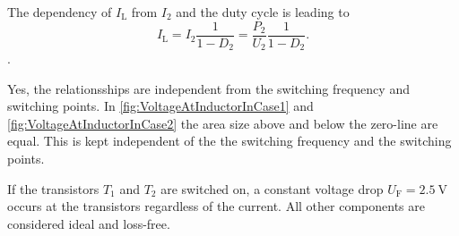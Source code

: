 \begin{solutionblock}
    The dependency of $I_\mathrm{L}$ from $I_\mathrm{2}$ and the duty cycle is leading to
    \begin{equation}
        I_\mathrm{L}=I_\mathrm{2} \frac{1}{1-D_2}= \frac{P_\mathrm{2}}{U_\mathrm{2}} \frac{1}{1-D_2}.
    \end{equation}.
\end{solutionblock}


\begin{solutionblock}
    Yes, the relationsships are independent from the switching frequency and switching points.
    In \autoref{fig:VoltageAtInductorInCase1} and \autoref{fig:VoltageAtInductorInCase2} the area size above and below the zero-line are equal.
    This is kept independent of the the switching frequency and the switching points.
\end{solutionblock}

\vspace{2em}\par
If the transistors $T_1$ and $T_2$ are switched on, a constant voltage drop $U_\mathrm{F}=\SI{2.5}{\volt}$ occurs at the transistors
 regardless of the current. All other components are considered ideal and loss-free.

